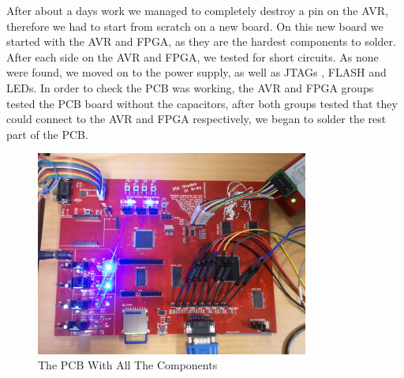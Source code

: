 After about a days work we managed to completely destroy a pin on the AVR, therefore we had to start from scratch on a new board. On this new board we started with the AVR and FPGA, as they are the hardest components to solder. After each side on the AVR and FPGA, we tested for short circuits. As none were found, we moved on to the power supply, as well as JTAGs , FLASH and LEDs. In order to check the PCB was working, the AVR and FPGA groups tested the PCB board without the capacitors, after both groups tested that they could connect to the AVR and FPGA respectively, we began to solder the rest part of the PCB. 
\begin{figure}[h]
  \centering
  \includegraphics[width=0.8\textwidth]{fig/pcb/pcbwithcomp.jpg}
  \caption{The PCB With All The Components}
  \label{fig:pcb}
\end{figure}